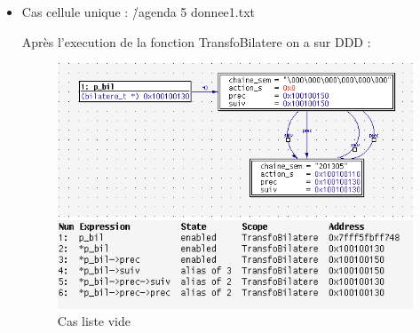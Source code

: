 \documentclass{report}
\begin{document}
\newpage
\begin{itemize}
    \item Cas cellule unique : \./agenda 5 donnee1.txt

\vspace{0.5cm}

\vspace{0.5cm}

Après l'execution de la fonction TransfoBilatere on a sur DDD :
\begin{figure}[!h] 
    \begin{center}
    \includegraphics[width=15cm]{cas_unique.png}
    \caption{Cas liste vide} %
    \includegraphics[width=15cm]{tab_cas_unique.png}
    \end{center}
\end{figure}
\end{itemize}
\end{document}
